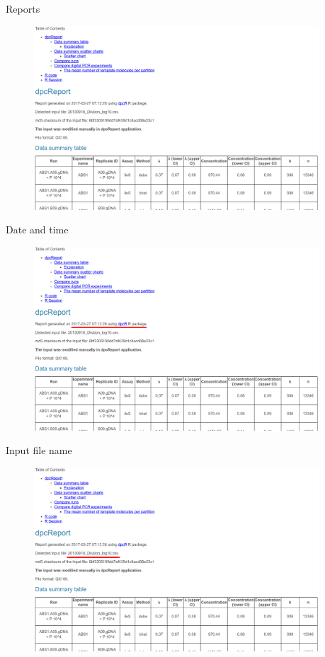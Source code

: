 \documentclass{beamer}\usepackage[]{graphicx}\usepackage[]{color}
\begin{document}
\begin{frame}{Reports}
\begin{figure} 
\includegraphics[width=0.95\textwidth]{static_figure/dcpReport_reprod1.png}
\end{figure}
\end{frame}


\begin{frame}{Date and time}
\begin{figure} 
\includegraphics[width=0.95\textwidth]{static_figure/dcpReport_reprod2.png}
\end{figure}
\end{frame}


\begin{frame}{Input file name}
\begin{figure} 
\includegraphics[width=0.95\textwidth]{static_figure/dcpReport_reprod3.png}
\end{figure}
\end{frame}
\end{document}

